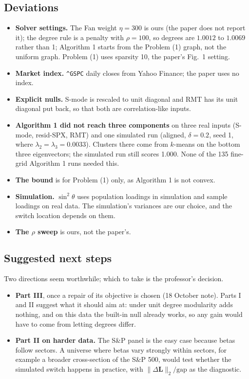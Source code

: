 \documentclass[11pt,a4paper]{article}
\newcommand{\Lap}{\mathbf{L}}
\theoremstyle{remark}
\begin{document}
\subsection{Deviations}

\begin{itemize}
\item \textbf{Solver settings.} The Fan weight $\eta=300$ is ours (the paper does not
  report it); the degree rule is a penalty with $\rho=100$, so degrees are $1.0012$ to
  $1.0069$ rather than 1; Algorithm 1 starts from the Problem (1) graph, not the
  uniform graph. Problem (1) uses sparsity 10, the paper's Fig.~1 setting.
\item \textbf{Market index.} \texttt{\^{}GSPC} daily closes from Yahoo Finance; the paper
  uses no index.
\item \textbf{Explicit nulls.} S-mode is rescaled to unit diagonal and RMT has its unit
  diagonal put back, so that both are correlation-like inputs.
\item \textbf{Algorithm 1 did not reach three components} on three real inputs
  (S-mode, resid-SPX, RMT) and one simulated run (aligned, $\delta=0.2$, seed 1, where
  $\lambda_2=\lambda_3=0.0033$). Clusters there come from $k$-means on the bottom three
  eigenvectors; the simulated run still scores 1.000. None of the 135 fine-grid
  Algorithm 1 runs needed this.
\item \textbf{The bound} is for Problem (1) only, as Algorithm 1 is not convex.
\item \textbf{Simulation.} $\sin^2\theta$ uses population loadings in simulation and
  sample loadings on real data. The simulation's variances are our choice, and the
  switch location depends on them.
\item \textbf{The $\rho$ sweep} is ours, not the paper's.
\end{itemize}

\subsection{Suggested next steps}

Two directions seem worthwhile; which to take is the professor's decision.
\begin{itemize}
\item \textbf{Part III}, once a repair of its objective is chosen (18 October note).
  Parts I and II suggest what it should aim at: under unit degree modularity adds
  nothing, and on this data the built-in null already works, so any gain would have to
  come from letting degrees differ.
\item \textbf{Part II on harder data.} The S\&P panel is the easy case because betas
  follow sectors. A universe where betas vary strongly within sectors, for example a
  broader cross-section of the S\&P 500, would test whether the simulated switch happens
  in practice, with $\lVert\Delta\Lap\rVert_2/\mathrm{gap}$ as the diagnostic.
\end{itemize}
\end{document}
